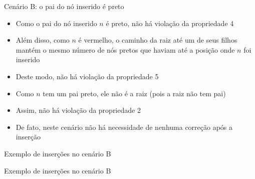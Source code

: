 \begin{frame}[fragile]{Cenário B: o pai do nó inserido é preto}

    \begin{itemize}
        \item Como o pai do nó inserido $n$ é preto, não há violação da propriedade 4

        \item Além disso, como $n$ é vermelho, o caminho da raiz até um de seus filhos mantém o
            mesmo número de nós pretos que haviam até a posição onde $n$ foi inserido

        \item Deste modo, não há violação da propriedade 5

        \item Como $n$ tem um pai preto, ele não é a raiz (pois a raiz não tem pai)

        \item Assim, não há violação da propriedade 2

        \item De fato, neste cenário não há necessidade de nenhuma correção após a inserção
    \end{itemize}

\end{frame}

\begin{frame}[fragile]{Exemplo de inserções no cenário B}


\end{frame}

\begin{frame}[fragile]{Exemplo de inserções no cenário B}


\end{frame}

